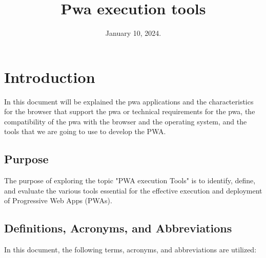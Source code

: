\documentclass[12pt,a4paper, twosite]{article}
\date{January 10, 2024.}
\title{Pwa execution tools}
\begin{document}
\maketitle

\newpage

\tableofcontents

\newpage

\section{Introduction}
\label{sec:org60390fa}

In this document will be explained the pwa applications and the characteristics for the browser that support the pwa or technical requirements for the pwa, the compatibility of the pwa with the browser and the operating system, and the tools that we are going to use to develop the PWA.

\subsection{Purpose}
\label{sec:org434c3ef}

The purpose of exploring the topic "PWA execution Tools" is to identify, define, and evaluate the various tools essential for the effective execution and deployment of Progressive Web Apps (PWAs). 

\subsection{Definitions, Acronyms, and Abbreviations}
\label{sec:orgb158e36}

In this document, the following terms, acronyms, and abbreviations are utilized:
\end{document}
